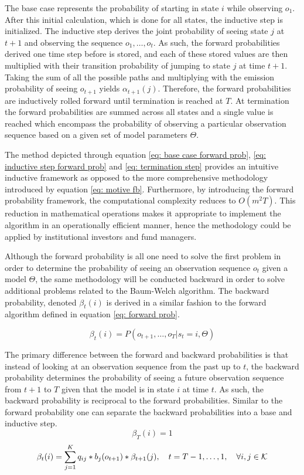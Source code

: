The base case represents the probability of starting in state $i$ while observing $o_1$. After this initial calculation, which is done for all states, the inductive step is initialized. The inductive step derives the joint probability of seeing state $j$ at $t+1$ and observing the sequence $o_1,\ldots,o_t$. As such, the forward probabilities derived one time step before is stored, and each of these stored values are then multiplied with their transition probability of jumping to state $j$ at time $t+1$. Taking the sum of all the possible paths and multiplying with the emission probability of seeing $o_{t+1}$ yields $\alpha_{t+1}(j)$. Therefore, the forward probabilities are inductively rolled forward until termination is reached at $T$. At termination the forward probabilities are summed across all states and a single value is reached which encompass the probability of observing a particular observation sequence based on a given set of model parameters $\Theta$.

The method depicted through equation \ref{eq: base case forward prob}, \ref{eq: inductive step forward prob} and \ref{eq: termination step} provides an intuitive inductive framework as opposed to the more comprehensive methodology introduced by equation \ref{eq: motive fb}. Furthermore, by introducing the forward probability framework, the computational complexity reduces to $O(m^2T)$. This reduction in mathematical operations makes it appropriate to implement the algorithm in an operationally efficient manner, hence the methodology could be applied by institutional investors and fund managers. 

Although the forward probability is all one need to solve the first problem in order to determine the probability of seeing an observation sequence $o_t$ given a model $\Theta$, the same methodology will be conducted backward in order to solve additional problems related to the Baum-Welch algorithm. The backward probability, denoted $\beta_t(i)$ is derived in a similar fashion to the forward algorithm defined in equation \ref{eq: forward prob}.

\begin{equation}
    \beta_t(i) = P(o_{t+1},\ldots,o_T | s_t = i, \Theta) 
\end{equation}

The primary difference between the forward and backward probabilities is that instead of looking at an observation sequence from the past up to $t$, the backward probability determines the probability of seeing a future observation sequence from $t+1$ to $T$ given that the model is in state $i$ at time $t$. As such, the backward probability is reciprocal to the forward probabilities. Similar to the forward probability one can separate the backward probabilities into a base and inductive step. 
\begin{equation}
    \beta_T(i) = 1 %
    \label{eq: base backward}
\end{equation}
\begin{equation}
   \beta_t(i) = \sum_{j=1}^K q_{ij}*b_j(o_{t+1})*\beta_{t+1}(j),
   \quad t = T-1,\ldots,1,
   \quad \forall i,j \in\operatorname{\mathcal{K}}
    \label{eq: Inductive backward}
\end{equation}

